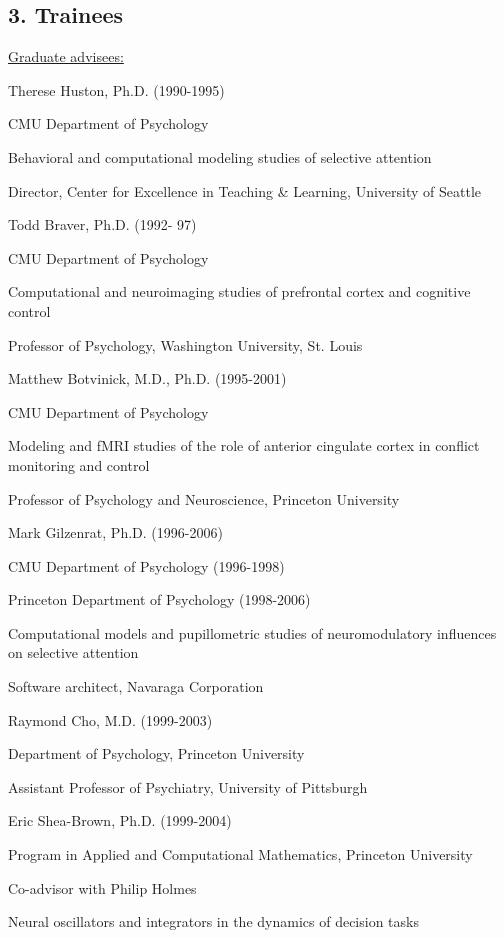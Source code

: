 \documentclass[10 pt]{article}
\begin{document}
\subsection*{3. Trainees} \label{secTEACHING3}
    \smallskip

{\fontsize{12pt}{16 pt}\selectfont \underline{Graduate advisees:}}
    \smallskip

Therese Huston, Ph.D. (1990-1995)

CMU Department of Psychology

Behavioral and computational modeling studies of selective attention

Director, Center for Excellence in Teaching \& Learning, University of Seattle
    \medskip

Todd Braver, Ph.D. (1992- 97)

CMU Department of Psychology

Computational and neuroimaging studies of prefrontal cortex and cognitive control

Professor of Psychology, Washington University, St. Louis
    \medskip

Matthew Botvinick, M.D., Ph.D. (1995-2001)

CMU Department of Psychology

Modeling and fMRI studies of the role of anterior cingulate cortex in conflict monitoring and control

Professor of Psychology and Neuroscience, Princeton University
    \medskip

Mark Gilzenrat, Ph.D. (1996-2006)

CMU Department of Psychology (1996-1998)

Princeton Department of Psychology (1998-2006)

Computational models and pupillometric studies of neuromodulatory influences on selective attention

Software architect, Navaraga Corporation
    \medskip

Raymond Cho, M.D. (1999-2003)

Department of Psychology, Princeton University

Assistant Professor of Psychiatry, University of Pittsburgh
    \medskip

Eric Shea-Brown, Ph.D. (1999-2004)

Program in Applied and Computational Mathematics, Princeton University

Co-advisor with Philip Holmes

Neural oscillators and integrators in the dynamics of decision tasks
\end{document}
